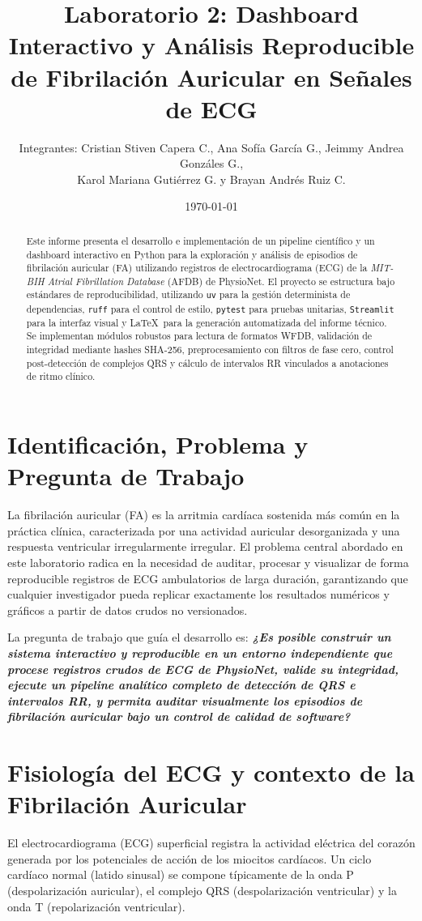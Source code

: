\documentclass[11pt,a4paper]{article}
\title{Laboratorio 2: Dashboard Interactivo y Análisis Reproducible de Fibrilación Auricular en Señales de ECG}
\author{Integrantes: Cristian Stiven Capera C., Ana Sofía García G., Jeimmy Andrea Gonzáles G.,\\
Karol Mariana Gutiérrez G. y Brayan Andrés Ruiz C.}
\date{\today}
\begin{document}
\maketitle

\begin{abstract}
Este informe presenta el desarrollo e implementación de un pipeline científico y un dashboard interactivo en Python para la exploración y análisis de episodios de fibrilación auricular (FA) utilizando registros de electrocardiograma (ECG) de la \textit{MIT-BIH Atrial Fibrillation Database} (AFDB) de PhysioNet. El proyecto se estructura bajo estándares de reproducibilidad, utilizando \texttt{uv} para la gestión determinista de dependencias, \texttt{ruff} para el control de estilo, \texttt{pytest} para pruebas unitarias, \texttt{Streamlit} para la interfaz visual y \LaTeX\ para la generación automatizada del informe técnico. Se implementan módulos robustos para lectura de formatos WFDB, validación de integridad mediante hashes SHA-256, preprocesamiento con filtros de fase cero, control post-detección de complejos QRS y cálculo de intervalos RR vinculados a anotaciones de ritmo clínico.
\end{abstract}

\section{Identificación, Problema y Pregunta de Trabajo}
La fibrilación auricular (FA) es la arritmia cardíaca sostenida más común en la práctica clínica, caracterizada por una actividad auricular desorganizada y una respuesta ventricular irregularmente irregular. El problema central abordado en este laboratorio radica en la necesidad de auditar, procesar y visualizar de forma reproducible registros de ECG ambulatorios de larga duración, garantizando que cualquier investigador pueda replicar exactamente los resultados numéricos y gráficos a partir de datos crudos no versionados. 

La pregunta de trabajo que guía el desarrollo es: \textbf{\textit{¿Es posible construir un sistema interactivo y reproducible en un entorno independiente que procese registros crudos de ECG de PhysioNet, valide su integridad, ejecute un pipeline analítico completo de detección de QRS e intervalos RR, y permita auditar visualmente los episodios de fibrilación auricular bajo un control de calidad de software?}}

\section{Fisiología del ECG y contexto de la Fibrilación Auricular}
El electrocardiograma (ECG) superficial registra la actividad eléctrica del corazón generada por los potenciales de acción de los miocitos cardíacos. Un ciclo cardíaco normal (latido sinusal) se compone típicamente de la onda P (despolarización auricular), el complejo QRS (despolarización ventricular) y la onda T (repolarización ventricular). 
\end{document}
